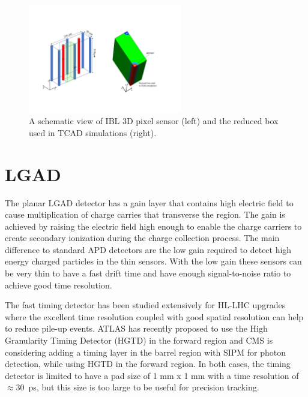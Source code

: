 \documentclass[aps,pt14,superscriptaddress,floatfix,nofootinbib]{revtex4}
\begin{document}
\begin{figure}[h!]
\begin{center}
\includegraphics[width=0.60\textwidth,keepaspectratio]{figures1/IBL3D_GL.pdf}
\caption{A schematic view of IBL 3D pixel sensor (left) and the reduced box used in TCAD simulations 
(right).\label{fig:ibl-3d}}
\end{center}
\end{figure}

\section{LGAD}
\label{sec:lgad}

The planar LGAD detector has a gain layer that contains high electric field to
cause multiplication of charge carries that transverse the region.
The gain is achieved by raising the electric field high enough to enable the
charge carriers to create secondary ionization during the charge collection process.
The main difference to standard APD detectors are the low gain
required to detect high energy charged particles in the thin sensors.
With the low gain these sensors can be very thin to have a fast drift time
and have enough signal-to-noise ratio to achieve good time resolution.

The fast timing detector has been studied extensively for HL-LHC upgrades where the
excellent time resolution coupled with good spatial resolution can help to
reduce pile-up events. ATLAS has recently proposed to use the High Granularity
Timing Detector (HGTD) in the forward region and CMS is considering adding
a timing layer in the barrel region with SIPM for photon detection, while using HGTD
in the forward region. In both cases, the timing detector is 
limited to have a pad size of 1 mm x 1 mm with a time resolution of $\approx$30~ps, but this 
size is too large to be useful for precision tracking.
\end{document}
